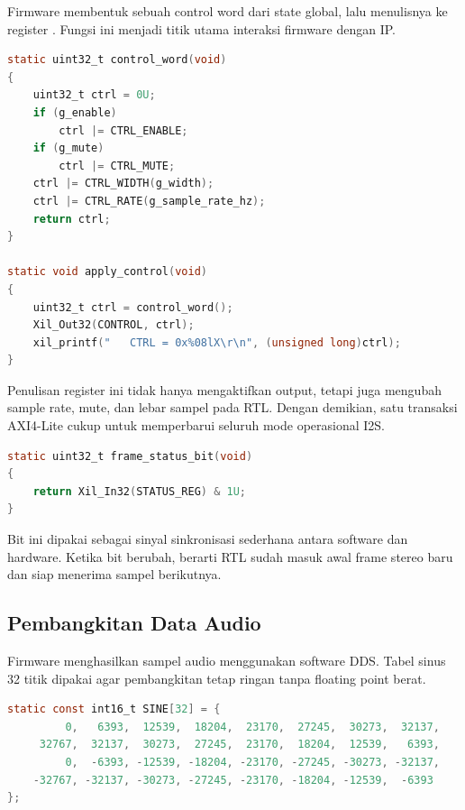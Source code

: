 Firmware membentuk sebuah control word dari state global, lalu menulisnya ke register . Fungsi ini menjadi titik utama interaksi firmware dengan IP.

\begin{lstlisting}[language=C,caption={Pembentukan dan penulisan control word.},label={lst:ch4-control-word}]
static uint32_t control_word(void)
{
    uint32_t ctrl = 0U;
    if (g_enable)
        ctrl |= CTRL_ENABLE;
    if (g_mute)
        ctrl |= CTRL_MUTE;
    ctrl |= CTRL_WIDTH(g_width);
    ctrl |= CTRL_RATE(g_sample_rate_hz);
    return ctrl;
}

static void apply_control(void)
{
    uint32_t ctrl = control_word();
    Xil_Out32(CONTROL, ctrl);
    xil_printf("   CTRL = 0x%08lX\r\n", (unsigned long)ctrl);
}
\end{lstlisting}

Penulisan register ini tidak hanya mengaktifkan output, tetapi juga mengubah sample rate, mute, dan lebar sampel pada RTL. Dengan demikian, satu transaksi AXI4-Lite cukup untuk memperbarui seluruh mode operasional I2S.

\begin{lstlisting}[language=C,caption={Pembacaan status latch dari register \texttt{STATUS}.},label={lst:ch4-status-bit}]
static uint32_t frame_status_bit(void)
{
    return Xil_In32(STATUS_REG) & 1U;
}
\end{lstlisting}

Bit ini dipakai sebagai sinyal sinkronisasi sederhana antara software dan hardware. Ketika bit berubah, berarti RTL sudah masuk awal frame stereo baru dan siap menerima sampel berikutnya.

\subsection{Pembangkitan Data Audio}

Firmware menghasilkan sampel audio menggunakan software DDS. Tabel sinus 32 titik dipakai agar pembangkitan tetap ringan tanpa floating point berat.

\begin{lstlisting}[language=C,caption={Tabel sinus 32 titik yang dipakai untuk software DDS.},label={lst:ch4-sine-table}]
static const int16_t SINE[32] = {
         0,   6393,  12539,  18204,  23170,  27245,  30273,  32137,
     32767,  32137,  30273,  27245,  23170,  18204,  12539,   6393,
         0,  -6393, -12539, -18204, -23170, -27245, -30273, -32137,
    -32767, -32137, -30273, -27245, -23170, -18204, -12539,  -6393
};
\end{lstlisting}

